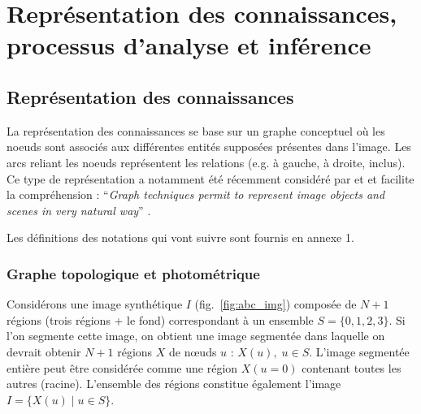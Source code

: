 

\chapter{Représentation des connaissances, processus d'analyse et inférence}
\label{chap:info_concept}

    \section{Représentation des connaissances}
    
    	La représentation des connaissances se base sur un graphe conceptuel où les noeuds sont associés aux différentes entités supposées présentes dans l'image. Les arcs reliant les noeuds représentent les relations (e.g. à gauche, à droite, inclus). Ce type de représentation a notamment été récemment considéré par \citep[Deruyver, p.1246]{deruyver2009} et \citep[Fasquel]{Fasquel2006} et facilite la compréhension : ``\textit{Graph techniques permit to represent image objects and scenes in very natural way}'' \citep[Sanfeliu]{Sanfeliu2002}. 
    	
    	Les définitions des notations qui vont suivre sont fournis en annexe 1.      



\subsection{Graphe topologique et photométrique}      
      Considérons une image synthétique $I$ (fig.~\ref{fig:abc_img}) composée de $N+1$ régions (trois régions + le fond) correspondant à un ensemble $S=\{0,1,2,3\}$. Si l'on segmente cette image, on obtient une image segmentée dans laquelle on devrait obtenir $N+1$ régions $X$ de n\oe{}uds $u$ : $X(u),\; u \in S$. L'image segmentée entière peut être considérée comme une région $X(u = 0)$ contenant toutes les autres (racine). L'ensemble des régions constitue également l'image $I = \{X(u)\;|\;u \in S\}$.\hspace{1em}

